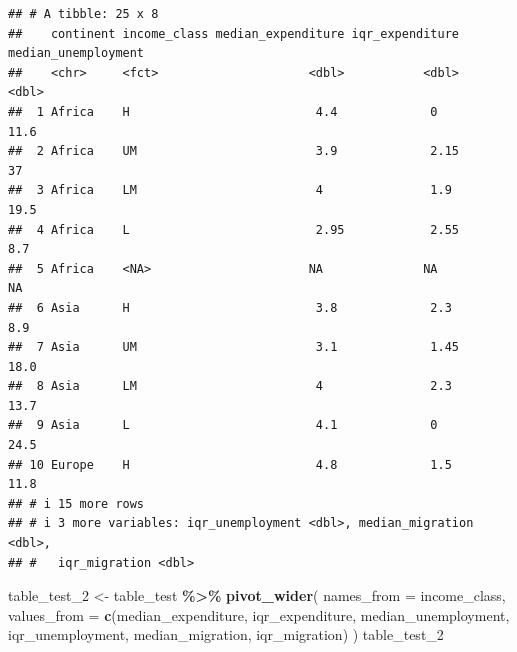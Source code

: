 \documentclass[
]{article}
\newenvironment{Shaded}{\begin{snugshade}}{\end{snugshade}}
\newcommand{\AttributeTok}[1]{\textcolor[rgb]{0.13,0.29,0.53}{#1}}
\newcommand{\FunctionTok}[1]{\textcolor[rgb]{0.13,0.29,0.53}{\textbf{#1}}}
\newcommand{\NormalTok}[1]{#1}
\newcommand{\OtherTok}[1]{\textcolor[rgb]{0.56,0.35,0.01}{#1}}
\newcommand{\SpecialCharTok}[1]{\textcolor[rgb]{0.81,0.36,0.00}{\textbf{#1}}}
\begin{document}
\begin{verbatim}
## # A tibble: 25 x 8
##    continent income_class median_expenditure iqr_expenditure median_unemployment
##    <chr>     <fct>                     <dbl>           <dbl>               <dbl>
##  1 Africa    H                          4.4             0                   11.6
##  2 Africa    UM                         3.9             2.15                37  
##  3 Africa    LM                         4               1.9                 19.5
##  4 Africa    L                          2.95            2.55                 8.7
##  5 Africa    <NA>                      NA              NA                   NA  
##  6 Asia      H                          3.8             2.3                  8.9
##  7 Asia      UM                         3.1             1.45                18.0
##  8 Asia      LM                         4               2.3                 13.7
##  9 Asia      L                          4.1             0                   24.5
## 10 Europe    H                          4.8             1.5                 11.8
## # i 15 more rows
## # i 3 more variables: iqr_unemployment <dbl>, median_migration <dbl>,
## #   iqr_migration <dbl>
\end{verbatim}

\begin{Shaded}
\begin{Highlighting}[]
\NormalTok{table\_test\_2 }\OtherTok{\textless{}{-}}\NormalTok{ table\_test }\SpecialCharTok{\%\textgreater{}\%}
  \FunctionTok{pivot\_wider}\NormalTok{(}
    \AttributeTok{names\_from =}\NormalTok{ income\_class,}
    \AttributeTok{values\_from =} \FunctionTok{c}\NormalTok{(median\_expenditure, iqr\_expenditure,}
\NormalTok{                    median\_unemployment, iqr\_unemployment,}
\NormalTok{                    median\_migration, iqr\_migration)}
\NormalTok{  )}
\NormalTok{table\_test\_2}
\end{Highlighting}
\end{Shaded}
\end{document}
